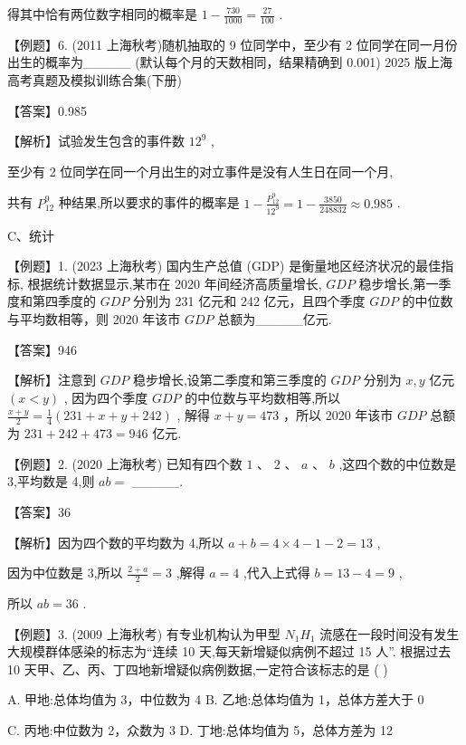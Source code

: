 \documentclass[10pt]{article}
\begin{document}
得其中恰有两位数字相同的概率是 \(1 - \frac{730}{1000} = \frac{27}{100}\) .

【例题】6. (2011 上海秋考)随机抽取的 9 位同学中，至少有 2 位同学在同一月份出生的概率为\_\_\_\_\_ (默认每个月的天数相同，结果精确到 0.001) 2025 版上海高考真题及模拟训练合集(下册)

【答案】0.985

【解析】试验发生包含的事件数 \({12}^{9}\) ,

至少有 2 位同学在同一个月出生的对立事件是没有人生日在同一个月,

共有 \({P}_{12}^{9}\) 种结果,所以要求的事件的概率是 \(1 - \frac{{P}_{12}^{9}}{{12}^{9}} = 1 - \frac{3850}{248832} \approx  {0.985}\) .

C、统计

【例题】1. (2023 上海秋考) 国内生产总值 (GDP) 是衡量地区经济状况的最佳指标, 根据统计数据显示,某市在 2020 年间经济高质量增长, \({GDP}\) 稳步增长,第一季度和第四季度的 \({GDP}\) 分别为 231 亿元和 242 亿元，且四个季度 \({GDP}\) 的中位数与平均数相等，则 2020 年该市 \({GDP}\) 总额为\_\_\_\_\_亿元.

【答案】946

【解析】注意到 \({GDP}\) 稳步增长,设第二季度和第三季度的 \({GDP}\) 分别为 \(x,y\) 亿元 \(\left( {x < y}\right)\) , 因为四个季度 \({GDP}\) 的中位数与平均数相等,所以 \(\frac{x + y}{2} = \frac{1}{4}\left( {{231} + x + y + {242}}\right)\) , 解得 \(x + y = {473}\) ，所以 2020 年该市 \({GDP}\) 总额为 \({231} + {242} + {473} = {946}\) 亿元.

【例题】2. (2020 上海秋考) 已知有四个数 \(1\text{ 、 }2\text{ 、 }a\text{ 、 }b\) ,这四个数的中位数是 3,平均数是 4,则 \({ab} =\) \_\_\_\_\_.

【答案】36

【解析】因为四个数的平均数为 4,所以 \(a + b = 4 \times  4 - 1 - 2 = {13}\) ,

因为中位数是 3,所以 \(\frac{2 + a}{2} = 3\) ,解得 \(a = 4\) ,代入上式得 \(b = {13} - 4 = 9\) ,

所以 \({ab} = {36}\) .

【例题】3. (2009 上海秋考) 有专业机构认为甲型 \({N}_{1}{H}_{1}\) 流感在一段时间没有发生大规模群体感染的标志为“连续 10 天,每天新增疑似病例不超过 15 人”. 根据过去 10 天甲、乙、丙、丁四地新增疑似病例数据,一定符合该标志的是 ( )

A. 甲地:总体均值为 3，中位数为 4 B. 乙地:总体均值为 1，总体方差大于 0

C. 丙地:中位数为 2，众数为 3 D. 丁地:总体均值为 5，总体方差为 12
\end{document}
